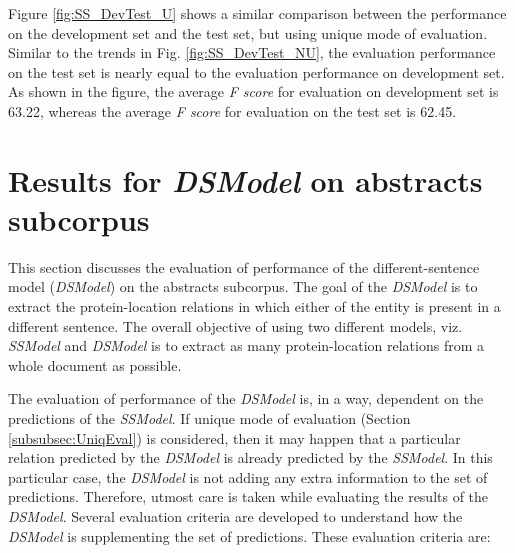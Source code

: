 Figure \ref{fig:SS_DevTest_U} shows a similar comparison between the performance on the development set and the test set, but using unique mode of evaluation. Similar to the trends in Fig. \ref{fig:SS_DevTest_NU}, the evaluation performance on the test set is nearly equal to the evaluation performance on development set. As shown in the figure, the average \textit{F score} for evaluation on development set is 63.22, whereas the average \textit{F score} for evaluation on the test set is 62.45.

\section{Results for \textit{DSModel} on abstracts subcorpus}

This section discusses the evaluation of performance of the different-sentence model (\textit{DSModel}) on the abstracts subcorpus. The goal of the \textit{DSModel} is to extract the protein-location relations in which either of the entity is present in a different sentence. The overall objective of using two different models, viz. \textit{SSModel} and \textit{DSModel} is to extract as many protein-location relations from a whole document as possible.

The evaluation of performance of the \textit{DSModel} is, in a way, dependent on the predictions of the \textit{SSModel}. If unique mode of evaluation (Section \ref{subsubsec:UniqEval}) is considered, then it may happen that a particular relation predicted by the \textit{DSModel} is already predicted by the \textit{SSModel}. In this particular case, the \textit{DSModel} is not adding any extra information to the set of predictions. Therefore, utmost care is taken while evaluating the results of the \textit{DSModel}. Several evaluation criteria are developed to understand how the \textit{DSModel} is supplementing the set of predictions. These evaluation criteria are:

